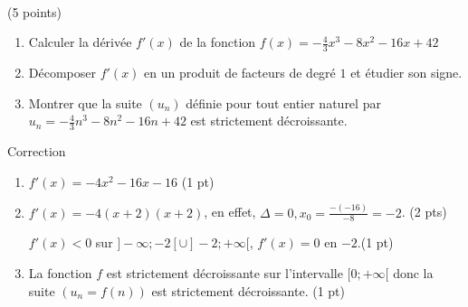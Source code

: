 \documentclass[a4paper,11pt]{article}
\theoremstyle{break}
\begin{document}
     ~
  \vspace{0.5cm}
  
 \begin{exo}(5 points)
  ~
      \vspace{0.25cm}
      
 
 \begin{enumerate}
 
 \item  Calculer la dérivée $f'(x)$ de la fonction
 $f(x)=-\frac{4}{3}x^3-8 x^2 -16 x +42$  
 \item Décomposer $f'(x)$ en un produit de facteurs de degré $1$ et étudier son signe.  
 \item Montrer que la suite $(u_n)$ définie pour tout entier naturel par 
 $u_n=-\frac{4}{3}n^3-8 n^2 -16 n +42$ est strictement décroissante. 
   
 \end{enumerate}

\begin{correction}

Correction
\begin{enumerate}
 \item $f'(x)=-4 x^2-16 x-16$ (1 pt)
 \item $f'(x)=-4(x+2)(x+2)$, en effet, $\Delta=0, x_0= \frac{-(-16)}{-8}=-2$. (2 pts)
 
 $f'(x)<0$ sur $]-\infty;-2[ \cup ]-2;+\infty[$, $f'(x)=0$ en $-2$.(1 pt)
 \item La fonction $f$ est strictement d\'ecroissante sur l'intervalle $[0;+\infty[$ donc la suite
 $(u_n=f(n))$ 
 est strictement d\'ecroissante. (1 pt)
\end{enumerate}


  
  
\end{correction}

  \end{exo}
  
   ~
  \vspace{0.5cm}
   
\end{document}
